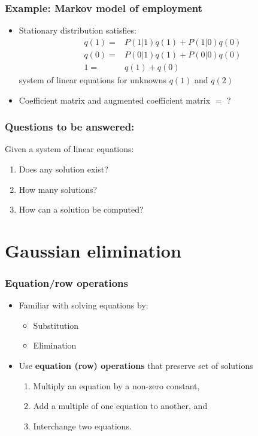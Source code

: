 \documentclass[compress]{beamer}
\theoremstyle{definition}
\begin{document}
\begin{frame}
  \frametitle{Example: Markov model of employment}
  \begin{itemize}
  \item Stationary distribution satisfies:
    \begin{align*}
      q(1) = & P(1|1) q(1) + P(1|0) q(0) \\
      q(0) = & P(0|1) q(1) + P(0|0) q(0) \\
      1 = & q(1) + q(0) 
    \end{align*}
    system of linear equations for unknowns $q(1)$ and $q(2)$
  \item Coefficient matrix and augmented coefficient matrix $=$ ?
  \end{itemize}
\end{frame}

\begin{frame}
  \frametitle{Questions to be answered:}
  Given a system of linear equations:
  \begin{enumerate}
  \item Does any solution exist?
  \item How many solutions?
  \item How can a solution be computed?
  \end{enumerate}  
\end{frame}

\section{Gaussian elimination}

\begin{frame}
  \frametitle{Equation/row operations}
  \begin{itemize}
  \item Familiar with solving equations by:
    \begin{itemize}
    \item Substitution
    \item Elimination
    \end{itemize}
  \item Use \textbf{equation (row) operations} that preserve set of
    solutions
    \begin{enumerate}
    \item Multiply an equation by a non-zero constant,
    \item Add a multiple of one equation to another, and
    \item Interchange two equations.
    \end{enumerate}
  \end{itemize}
\end{frame}
\end{document}
